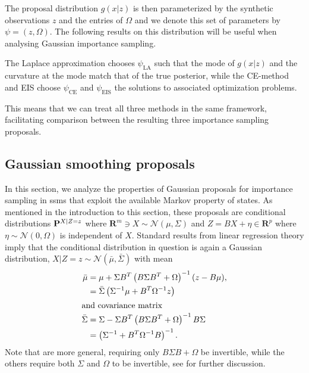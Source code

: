 The proposal distribution $g(x|z)$ is then parameterized by the synthetic observations $z$ and the entries of $\Omega$ and we denote this set of parameters by $\psi = (z, \Omega)$.
The following results on this distribution will be useful when analysing Gaussian importance sampling.

The Laplace approximation chooses $\psi_{\text{LA}}$ such that the mode of $g(x|z)$ and the curvature at the mode match that of the true posterior, while the CE-method and EIS choose $\psi_{\text{CE}}$ and $\psi_{\text{EIS}}$ the solutions to associated optimization problems.

This means that we can treat all three methods in the same framework, facilitating comparison between the resulting three importance sampling proposals.


\subsection{Gaussian smoothing proposals}
\label{subsec:gaussian_smoothing_proposals}
In this section, we analyze the properties of Gaussian proposals for importance sampling in \glspl{ssm} that exploit the available Markov property of states. As mentioned in the introduction to this section, these proposals are conditional distributions $\P^{X|Z=z}$ where $ \mathbf{R}^{m} \ni X \sim \mathcal N \left( \mu, \Sigma \right)$ and $Z = BX + \eta \in \mathbf{R}^{p}$ where $\eta\sim\mathcal N(0, \Omega)$ is independent of $X$. Standard results from linear regression theory imply that the conditional distribution in question is again a Gaussian distribution, $X|Z=z \sim \mathcal N(\bar \mu, \bar \Sigma)$ with mean
\begin{align}
    \bar \mu    & = \mu + \Sigma B^{T} \left( B \Sigma B^{T} + \Omega \right)^{-1} (z - B \mu), \label{eq:posterior_mean_1} \\
                & = \bar \Sigma\left(\Sigma^{-1}\mu + B^{T}\Omega^{-1}z \right)\label{eq:posterior_mean_2}                  \\
    \intertext{and covariance matrix}
    \bar \Sigma & = \Sigma - \Sigma B^T \left( B\Sigma B^{T} + \Omega \right) ^{-1} B \Sigma \label{eq:posterior_cov_1}     \\
                & = \left(\Sigma^{-1} + B^{T}\Omega^{-1}B\right)^{-1} \label{eq:posterior_cov_2}.
\end{align}
Note that  are more general, requiring only $B \Sigma B + \Omega$ be invertible, while the others require both $\Sigma$ and $\Omega$ to be invertible, see \cite[Lemma 7.1]{Chopin2020Introduction} for further discussion.

